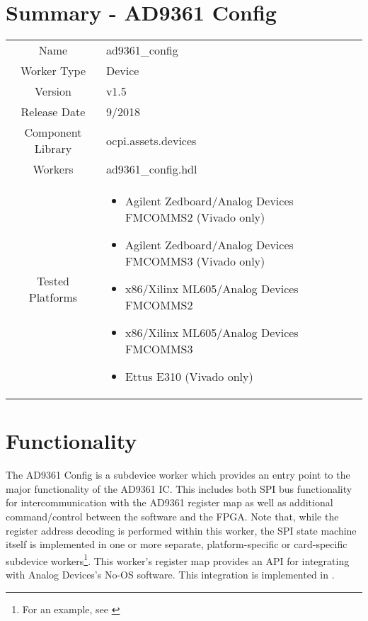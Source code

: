 \documentclass{article}
\author{} %
\date{Version \docVersion} %
\title{\docTitle}
\def\docVersion{1.5}
\def\comp{ad9361\_config}
\def\Comp{AD9361 Config}
\begin{document}
\section*{Summary - \Comp}
\begin{tabular}{|c|M{13.5cm}|}
  \hline
                    &                  \\
  \hline
  Name              & \comp            \\
  \hline
  Worker Type       & Device           \\
  \hline
  Version           & v\docVersion   \\
  \hline
  Release Date      & 9/2018         \\
  \hline
  Component Library & ocpi.assets.devices     \\
  \hline
  Workers           & \comp.hdl        \\
  \hline
	Tested Platforms  &
\begin{itemize}
  \item Agilent Zedboard/Analog Devices FMCOMMS2 (Vivado only)
  \item Agilent Zedboard/Analog Devices FMCOMMS3 (Vivado only)
  \item x86/Xilinx ML605/Analog Devices FMCOMMS2
  \item x86/Xilinx ML605/Analog Devices FMCOMMS3
  \item Ettus E310 (Vivado only)
\end{itemize} \\
  \hline
\end{tabular}

\tableofcontents

\section{Functionality}
  The \Comp{} is a subdevice worker which provides an entry point to the major functionality of the AD9361 IC\cite{ad9361}. This includes both SPI bus functionality for intercommunication with the AD9361 register map as well as additional command/control between the software and the FPGA. Note that, while the register address decoding is performed within this worker, the SPI state machine itself is implemented in one or more separate, platform-specific or card-specific subdevice workers\footnote{For an example, see \cite{spi_comp_datasheet}}. This worker's register map provides an API for integrating with Analog Devices's No-OS software\cite{no_os}. This integration is implemented in \cite{config_proxy_comp_datasheet}.
\end{document}
